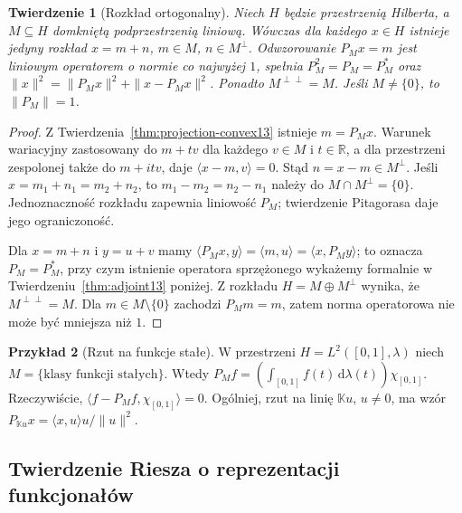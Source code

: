 \documentclass[11pt,a4paper]{article}
\numberwithin{equation}{section}
\theoremstyle{plain}
\newtheorem{twierdzenie}{Twierdzenie}[section]
\theoremstyle{definition}
\newtheorem{przyklad}[twierdzenie]{Przykład}
\theoremstyle{remark}
\newcommand{\R}{\mathbb R}
\newcommand{\K}{\mathbb K}
\begin{document}
\begin{twierdzenie}[Rozkład ortogonalny]
\label{thm:orth-decomposition13}
Niech $H$ będzie przestrzenią Hilberta, a $M\subseteq H$ domkniętą
podprzestrzenią liniową. Wówczas dla każdego $x\in H$ istnieje
jedyny rozkład $x=m+n$, $m\in M$, $n\in M^\perp$.
Odwzorowanie $P_Mx=m$ jest liniowym operatorem o normie co najwyżej
$1$, spełnia $P_M^2=P_M=P_M^*$ oraz
$\|x\|^2=\|P_Mx\|^2+\|x-P_Mx\|^2$.
Ponadto $M^{\perp\perp}=M$.
Jeśli $M\ne\{0\}$, to $\|P_M\|=1$.
\end{twierdzenie}
\begin{proof}
Z Twierdzenia~\ref{thm:projection-convex13} istnieje $m=P_Mx$.
Warunek wariacyjny zastosowany do $m+tv$ dla każdego $v\in M$
i $t\in\R$, a dla przestrzeni zespolonej także do $m+itv$,
daje $\langle x-m,v\rangle=0$. Stąd $n=x-m\in M^\perp$.
Jeśli $x=m_1+n_1=m_2+n_2$, to $m_1-m_2=n_2-n_1$ należy
do $M\cap M^\perp=\{0\}$. Jednoznaczność rozkładu zapewnia
liniowość $P_M$; twierdzenie Pitagorasa daje jego ograniczoność.

Dla $x=m+n$ i $y=u+v$ mamy
$\langle P_Mx,y\rangle=\langle m,u\rangle
=\langle x,P_My\rangle$; to oznacza $P_M=P_M^*$,
przy czym istnienie operatora sprzężonego wykażemy formalnie
w Twierdzeniu~\ref{thm:adjoint13} poniżej.
Z rozkładu $H=M\oplus M^\perp$ wynika, że
$M^{\perp\perp}=M$. Dla $m\in M\setminus\{0\}$ zachodzi
$P_Mm=m$, zatem norma operatorowa nie może być mniejsza niż $1$.
\end{proof}

\begin{przyklad}[Rzut na funkcje stałe]
\label{ex:projection-mean13}
W przestrzeni $H=L^2([0,1],\lambda)$ niech
$M=\{\text{klasy funkcji stałych}\}$. Wtedy
$P_Mf=(\int_{[0,1]}f(t)\,\mathrm d\lambda(t))\chi_{[0,1]}$.
Rzeczywiście, $\langle f-P_Mf,\chi_{[0,1]}\rangle=0$.
Ogólniej, rzut na linię $\K u$, $u\ne0$, ma wzór
$P_{\K u}x=\langle x,u\rangle u/\|u\|^2$.
\end{przyklad}

\subsection{Twierdzenie Riesza o reprezentacji funkcjonałów}
\end{document}

